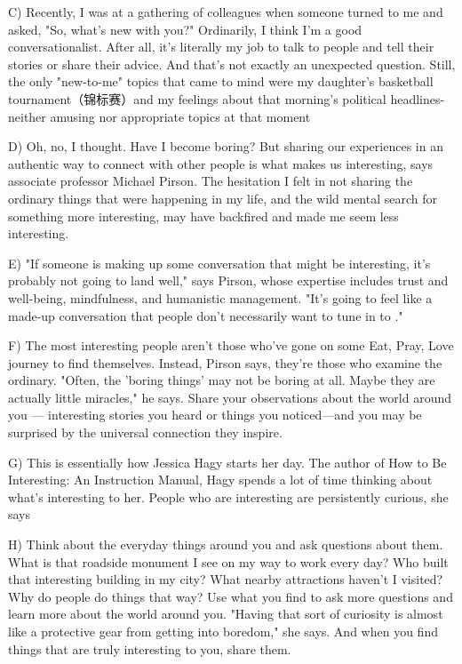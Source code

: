 \documentclass[UTF8,11pt]{ctexart}
\begin{document}
C) Recently, I was at a gathering of colleagues when someone turned to me and asked, "So, what's new with you?" Ordinarily, I think I'm a good conversationalist. After all, it's literally my job to talk to people and tell their stories or share their advice. And that's not exactly an unexpected question. Still, the only "new-to-me" topics that came to mind were my daughter's basketball tournament（锦标赛）and my feelings about that morning's political headlines- neither amusing nor appropriate topics at that moment


D) Oh, no, I thought. Have I become boring? But sharing our experiences in an authentic way to connect with other people is what makes us interesting, says associate professor Michael Pirson. The hesitation I felt in not sharing the ordinary things that were happening in my life, and the wild mental search for something more interesting, may have backfired and made me seem less interesting.


E) "If someone is making up some conversation that might be interesting, it's probably not going to land well," says Pirson, whose expertise includes trust and well-being, mindfulness, and humanistic management. "It's going to feel like a made-up conversation that people don't necessarily want to tune in to ."


F) The most interesting people aren't those who've gone on some Eat, Pray, Love journey to find themselves. Instead, Pirson says, they're those who examine the ordinary. "Often, the 'boring things' may not be boring at all. Maybe they are actually little miracles," he says. Share your observations about the world around you — interesting stories you heard or things you noticed—and you may be surprised by the universal connection they inspire.


G) This is essentially how Jessica Hagy starts her day. The author of How to Be Interesting: An Instruction Manual, Hagy spends a lot of time thinking about what's interesting to her. People who are interesting are persistently curious, she says


H) Think about the everyday things around you and ask questions about them. What is that roadside monument I see on my way to work every day? Who built that interesting building in my city? What nearby attractions haven't I visited? Why do people do things that way? Use what you find to ask more questions and learn more about the world around you. "Having that sort of curiosity is almost like a protective gear from getting into boredom," she says. And when you find things that are truly interesting to you, share them.
\end{document}
